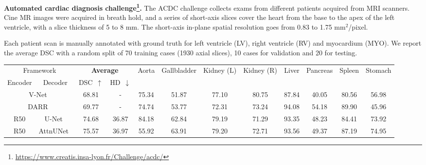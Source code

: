 \documentclass[runningheads]{llncs}
\begin{document}
\noindent\textbf{Automated cardiac diagnosis challenge\footnote{\url{https://www.creatis.insa-lyon.fr/Challenge/acdc/}}.}   The ACDC challenge collects exams from different patients acquired from MRI scanners. Cine MR images were acquired in breath hold, and a series of short-axis slices cover the heart from the base to the apex of the left ventricle, with a slice thickness of 5 to 8 mm. The short-axis in-plane spatial resolution goes from 0.83 to 1.75 mm$^2$/pixel.

Each patient scan is manually annotated with ground truth for left ventricle (LV), right ventricle (RV) and myocardium (MYO). We report the average DSC with a random split of 70 training cases (1930 axial slices), 10 cases for validation and 20 for testing.

\vspace{-1em}
\begin{table}[]
\footnotesize
\renewcommand\tabcolsep{1.0pt}
\resizebox{\textwidth}{!}
{
\begin{tabular}{cccccccccccc}
\hline
\multicolumn{2}{c}{Framework} & \multicolumn{2}{c}{\textbf{Average}} & \multirow{2}{*}{Aorta} & \multirow{2}{*}{Gallbladder} & \multirow{2}{*}{Kidney (L)} & \multirow{2}{*}{Kidney (R)} & \multirow{2}{*}{Liver} & \multirow{2}{*}{Pancreas} & \multirow{2}{*}{Spleen} & \multirow{2}{*}{Stomach} \\
\cmidrule(lr){1-2} \cmidrule(lr){3-4} 
Encoder & Decoder & DSC~$\uparrow$ & HD~$\downarrow$         
&          &         &             &            &             &           &             &           \\ 
\hline
\multicolumn{2}{c}{V-Net~\cite{milletari2016v}}     & 68.81        & -            & 75.34          & 51.87              & 77.10             & 80.75             & 87.84           & 40.05            & 80.56          & 56.98           \\
\multicolumn{2}{c}{DARR~\cite{fu2020domain}}      & 69.77        & -            & 74.74           & 53.77             & 72.31            & 73.24             & 94.08           & 54.18            & 89.90           & 45.96            \\
R50        & U-Net~\cite{ronneberger2015u}             & 74.68        & 36.87        & 84.18      & 62.84          & 79.19         & 71.29          & 93.35        & 48.23       & 84.41       & 73.92        \\
R50        & \scriptsize{AttnUNet}~\cite{schlemper2019attention} & 75.57   & 36.97        & 55.92      & 63.91          & 79.20         & 72.71          & 93.56       & 49.37        & 87.19       & 74.95        \\ \hline 

\end{tabular}}
\end{table}
\end{document}
